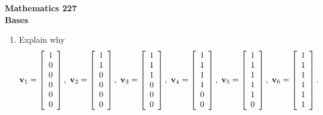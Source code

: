 \documentclass[12pt]{article}
\newcommand{\vvec}{{\mathbf v}}
\begin{document}
\noindent
{\bf Mathematics 227} \\ 
{\bf Bases}

\bigskip
\begin{enumerate}
\item Explain why
  $$
  \vvec_1 =
  \left[
    \begin{array}{c} 1 \\ 0 \\ 0 \\ 0 \\ 0 \\ 0 \\
    \end{array}
  \right], \hspace*{3pt}
  \vvec_2 =
  \left[
    \begin{array}{c} 1 \\ 1 \\ 0 \\ 0 \\ 0 \\ 0 \\
    \end{array}
  \right], \hspace*{3pt}
  \vvec_3 =
  \left[
    \begin{array}{c} 1 \\ 1 \\ 1 \\ 0 \\ 0 \\ 0 \\
    \end{array}
  \right], \hspace*{3pt}
  \vvec_4 =
  \left[
    \begin{array}{c} 1 \\ 1 \\ 1 \\ 1 \\ 0 \\ 0 \\
    \end{array}
  \right], \hspace*{3pt}
  \vvec_5 =
  \left[
    \begin{array}{c} 1 \\ 1 \\ 1 \\ 1 \\ 1 \\ 0 \\
    \end{array}
  \right], \hspace*{3pt}
  \vvec_6 =
  \left[
    \begin{array}{c} 1 \\ 1 \\ 1 \\ 1 \\ 1 \\ 1 \\
    \end{array}
  \right].
  $$


\end{enumerate}
\end{document}
